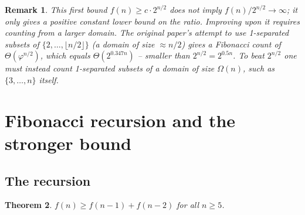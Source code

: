 \documentclass[11pt]{amsart}
\newtheorem{theorem}{Theorem}[section]
\newtheorem{remark}[theorem]{Remark}
\begin{document}
\begin{remark}\label{rem:fibonacci_domain}
This first bound $f(n)\ge c\cdot 2^{n/2}$ does \emph{not} imply $f(n)/2^{n/2}
\to\infty$; it only gives a positive constant lower bound on the ratio.  Improving
upon it requires counting from a \emph{larger} domain.  The original paper's attempt
to use 1-separated subsets of $\{2,\ldots,\lfloor n/2\rfloor\}$ (a domain of size
$\approx n/2$) gives a Fibonacci count of $\Theta(\varphi^{n/2})$, which equals
$\Theta(2^{0.347n})$ -- \emph{smaller} than $2^{n/2}=2^{0.5n}$.  To beat $2^{n/2}$
one must instead count 1-separated subsets of a domain of size $\Omega(n)$, such as
$\{3,\ldots,n\}$ itself.
\end{remark}

\section{Fibonacci recursion and the stronger bound}\label{sec:fibonacci}

\subsection{The recursion}

\begin{theorem}\label{thm:recursion}
$f(n)\ge f(n-1)+f(n-2)$ for all $n\ge 5$.
\end{theorem}
\end{document}
